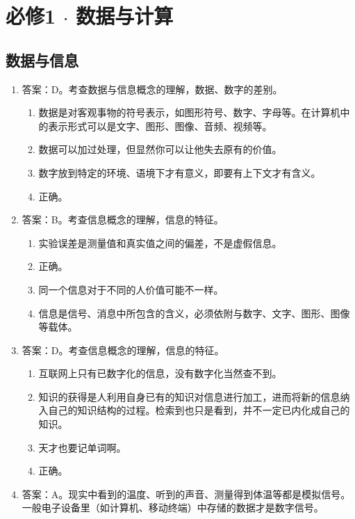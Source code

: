 \chapter{必修1 $\cdot$ 数据与计算}
\section{数据与信息}

\begin{enumerate}
\item 答案：D。考查数据与信息概念的理解，数据、数字的差别。
	\begin{enumerate}[label=\Alph*.]
	\item 数据是对客观事物的符号表示，如图形符号、数字、字母等。在计算机中的表示形式可以是文字、图形、图像、音频、视频等。
	\item 数据可以加过处理，但显然你可以让他失去原有的价值。
	\item 数字放到特定的环境、语境下才有意义，即要有上下文才有含义。
	\item 正确。
	\end{enumerate}

\item 答案：B。考查信息概念的理解，信息的特征。
	\begin{enumerate}[label=\Alph*.]
	\item 实验误差是测量值和真实值之间的偏差，不是虚假信息。
	\item 正确。
	\item 同一个信息对于不同的人价值可能不一样。
	\item 信息是信号、消息中所包含的含义，必须依附与数字、文字、图形、图像等载体。
	\end{enumerate}

\item 答案：D。考查信息概念的理解，信息的特征。
	\begin{enumerate}[label=\Alph*.]
	\item 互联网上只有已数字化的信息，没有数字化当然查不到。
	\item 知识的获得是人利用自身已有的知识对信息进行加工，进而将新的信息纳入自己的知识结构的过程。检索到也只是看到，并不一定已内化成自己的知识。
	\item 天才也要记单词啊。
	\item 正确。
	\end{enumerate}

\item 答案：A。现实中看到的温度、听到的声音、测量得到体温等都是模拟信号。一般电子设备里（如计算机、移动终端）中存储的数据才是数字信号。


\end{enumerate}
